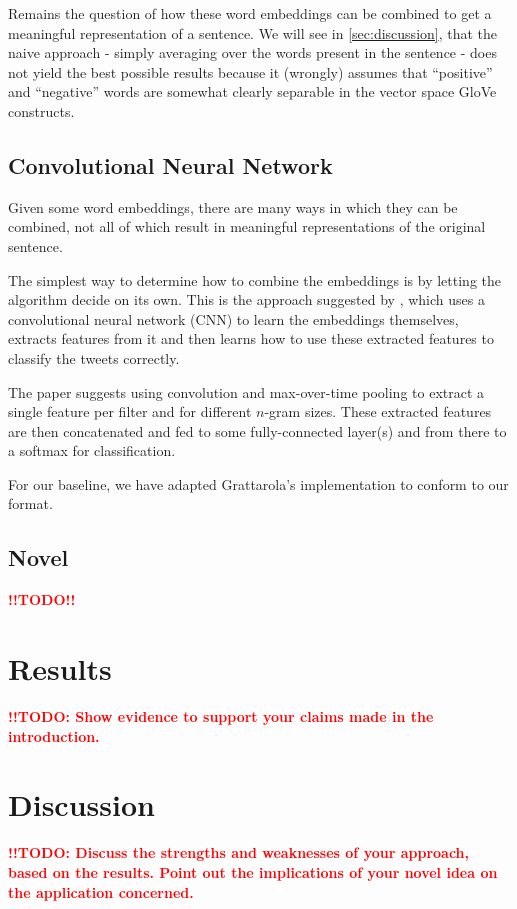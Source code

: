 \documentclass[10pt,conference,compsocconf]{IEEEtran}
\newcommand{\todo}{\textcolor{red}{\textbf{!!TODO!!}}}
\newcommand{\todoThis}[1]{\textcolor{red}{\textbf{!!TODO: #1}}}
\begin{document}
Remains the question of how these word embeddings can be combined to get a meaningful representation of a sentence. We will see in \autoref{sec:discussion}, that the naive approach - simply averaging over the words present in the sentence - does not yield the best possible results because it (wrongly) assumes that ``positive'' and ``negative'' words are somewhat clearly separable in the vector space GloVe constructs.

\subsection{Convolutional Neural Network}\label{sub:cnn}
Given some word embeddings, there are many ways in which they can be combined, not all of which result in meaningful representations of the original sentence.

The simplest way to determine how to combine the embeddings is by letting the algorithm decide on its own. This is the approach suggested by \cite{cnn_paper}, which uses a convolutional neural network (CNN) to learn the embeddings themselves, extracts features from it and then learns  how to use these extracted features to classify the tweets correctly.

The paper suggests using convolution and max-over-time pooling to extract a single feature per filter and for different $n$-gram sizes. These extracted features are then concatenated and fed to some fully-connected layer(s) and from there to a softmax for classification.

For our baseline, we have adapted Grattarola's implementation \cite{cnn_base} to conform to our format.

\subsection{Novel}\label{sub:novel}
\todo

\section{Results}\label{sec:results}
\todoThis{Show evidence to support your claims made in the
  introduction.}
  
\section{Discussion}\label{sec:discussion}
\todoThis{Discuss the strengths and weaknesses of your
  approach, based on the results. Point out the implications of your
  novel idea on the application concerned.}
  
\end{document}
